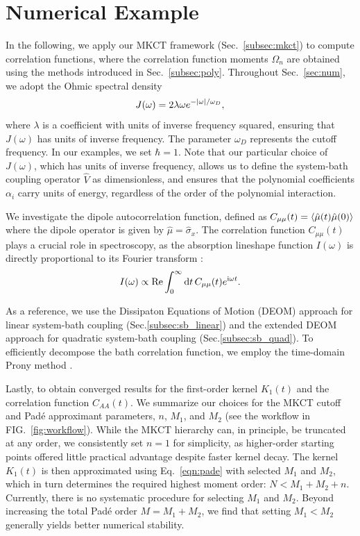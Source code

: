 \documentclass[preprint,aip,jcp]{revtex4-2}
\newcommand{\im}{\textup{i}}
\begin{document}
\section{\label{sec:num}Numerical Example}
In the following, we apply our MKCT framework (Sec.~\ref{subsec:mkct}) 
to compute correlation functions, where the correlation function moments $\Omega_n$ are obtained using the methods introduced in Sec.~\ref{subsec:poly}. Throughout Sec.~\ref{sec:num}, we adopt the Ohmic spectral density
\begin{equation}\label{eqn:exp_spe}
    J(\omega) = 2\lambda\omega e^{-\abs{\omega}/\omega_D}, 
\end{equation}
where $\lambda$ is a coefficient with units of inverse frequency squared, ensuring that $J(\omega)$ has units of inverse frequency. The parameter $\omega_D$ represents the cutoff frequency. In our examples, we set $\hbar = 1$. Note that our particular choice of $J(\omega)$, which has units of inverse frequency, allows us to define the system-bath coupling operator $\hat{V}$ as dimensionless, and ensures that the polynomial coefficients ${\alpha_i}$ carry units of energy, regardless of the order of the polynomial interaction.

We investigate the dipole autocorrelation function, defined as $C_{\mu\mu}(t) = \expval{\hat{\mu}(t)\hat{\mu}(0)}$ where the dipole operator is given by $\hat{\mu} = \hat{\sigma}_x$. The correlation function $C_{\mu\mu}(t)$ plays a crucial role in spectroscopy, as the absorption lineshape function $I(\omega)$ is directly proportional to its Fourier transform \cite{ma2015spec}:
\begin{equation}
    I(\omega) \propto \Re \int_0^{\infty} \dd{t} C_{\mu\mu}(t) e^{\im \omega t}.
\end{equation}

As a reference, we use the Dissipaton Equations of Motion (DEOM) approach \cite{wang2022DEOM} for linear system-bath coupling (Sec.\ref{subsec:sb_linear}) and the extended DEOM approach \cite{Xu2018Nonlinear} for quadratic system-bath coupling (Sec.\ref{subsec:sb_quad}). To efficiently decompose the bath correlation function, we employ the time-domain Prony method \cite{zihao2022prony}.

Lastly, to obtain converged results for the first-order kernel $K_1(t)$ and the correlation function $C_{AA}(t)$. We summarize our choices for the MKCT cutoff and Pad\'{e} approximant parameters, $n$, $M_1$, and $M_2$ (see the workflow in FIG.~\ref{fig:workflow}). While the MKCT hierarchy can, in principle, be truncated at any order, we consistently set $n=1$ for simplicity, as higher-order starting points offered little practical advantage despite faster kernel decay. The kernel $K_1(t)$ is then approximated using Eq.~\ref{eqn:pade} with selected $M_1$ and $M_2$, which in turn determines the required highest moment order: $N<M_1+M_2+n$. Currently, there is no systematic procedure for selecting $M_1$ and $M_2$. Beyond increasing the total Pad\'{e} order $M=M_1 + M_2$, we find that setting $M_1 < M_2$ generally yields better numerical stability.
\end{document}
